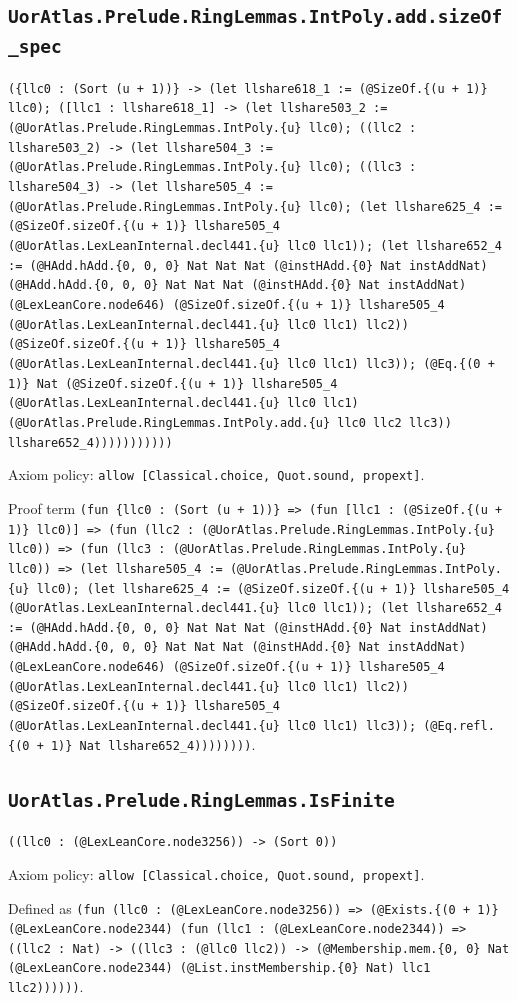\documentclass[11pt]{article}
\begin{document}
\subsection*{\texttt{UorAtlas.Prelude.RingLemmas.IntPoly.add.sizeOf\_spec}}
\noindent\texttt{(\{llc0 : (Sort (u + 1))\} -> (let llshare618\_1 := (@SizeOf.\{(u + 1)\} llc0); ([llc1 : llshare618\_1] -> (let llshare503\_2 := (@UorAtlas.Prelude.RingLemmas.IntPoly.\{u\} llc0); ((llc2 : llshare503\_2) -> (let llshare504\_3 := (@UorAtlas.Prelude.RingLemmas.IntPoly.\{u\} llc0); ((llc3 : llshare504\_3) -> (let llshare505\_4 := (@UorAtlas.Prelude.RingLemmas.IntPoly.\{u\} llc0); (let llshare625\_4 := (@SizeOf.sizeOf.\{(u + 1)\} llshare505\_4 (@UorAtlas.LexLeanInternal.decl441.\{u\} llc0 llc1)); (let llshare652\_4 := (@HAdd.hAdd.\{0, 0, 0\} Nat Nat Nat (@instHAdd.\{0\} Nat instAddNat) (@HAdd.hAdd.\{0, 0, 0\} Nat Nat Nat (@instHAdd.\{0\} Nat instAddNat) (@LexLeanCore.node646) (@SizeOf.sizeOf.\{(u + 1)\} llshare505\_4 (@UorAtlas.LexLeanInternal.decl441.\{u\} llc0 llc1) llc2)) (@SizeOf.sizeOf.\{(u + 1)\} llshare505\_4 (@UorAtlas.LexLeanInternal.decl441.\{u\} llc0 llc1) llc3)); (@Eq.\{(0 + 1)\} Nat (@SizeOf.sizeOf.\{(u + 1)\} llshare505\_4 (@UorAtlas.LexLeanInternal.decl441.\{u\} llc0 llc1) (@UorAtlas.Prelude.RingLemmas.IntPoly.add.\{u\} llc0 llc2 llc3)) llshare652\_4)))))))))))}\par
\noindent Axiom policy: \texttt{allow [Classical.choice, Quot.sound, propext]}.\par
\noindent Proof term \texttt{(fun \{llc0 : (Sort (u + 1))\} => (fun [llc1 : (@SizeOf.\{(u + 1)\} llc0)] => (fun (llc2 : (@UorAtlas.Prelude.RingLemmas.IntPoly.\{u\} llc0)) => (fun (llc3 : (@UorAtlas.Prelude.RingLemmas.IntPoly.\{u\} llc0)) => (let llshare505\_4 := (@UorAtlas.Prelude.RingLemmas.IntPoly.\{u\} llc0); (let llshare625\_4 := (@SizeOf.sizeOf.\{(u + 1)\} llshare505\_4 (@UorAtlas.LexLeanInternal.decl441.\{u\} llc0 llc1)); (let llshare652\_4 := (@HAdd.hAdd.\{0, 0, 0\} Nat Nat Nat (@instHAdd.\{0\} Nat instAddNat) (@HAdd.hAdd.\{0, 0, 0\} Nat Nat Nat (@instHAdd.\{0\} Nat instAddNat) (@LexLeanCore.node646) (@SizeOf.sizeOf.\{(u + 1)\} llshare505\_4 (@UorAtlas.LexLeanInternal.decl441.\{u\} llc0 llc1) llc2)) (@SizeOf.sizeOf.\{(u + 1)\} llshare505\_4 (@UorAtlas.LexLeanInternal.decl441.\{u\} llc0 llc1) llc3)); (@Eq.refl.\{(0 + 1)\} Nat llshare652\_4))))))))}.\par
\subsection*{\texttt{UorAtlas.Prelude.RingLemmas.IsFinite}}
\noindent\texttt{((llc0 : (@LexLeanCore.node3256)) -> (Sort 0))}\par
\noindent Axiom policy: \texttt{allow [Classical.choice, Quot.sound, propext]}.\par
\noindent Defined as \texttt{(fun (llc0 : (@LexLeanCore.node3256)) => (@Exists.\{(0 + 1)\} (@LexLeanCore.node2344) (fun (llc1 : (@LexLeanCore.node2344)) => ((llc2 : Nat) -> ((llc3 : (@llc0 llc2)) -> (@Membership.mem.\{0, 0\} Nat (@LexLeanCore.node2344) (@List.instMembership.\{0\} Nat) llc1 llc2))))))}.\par
\end{document}
